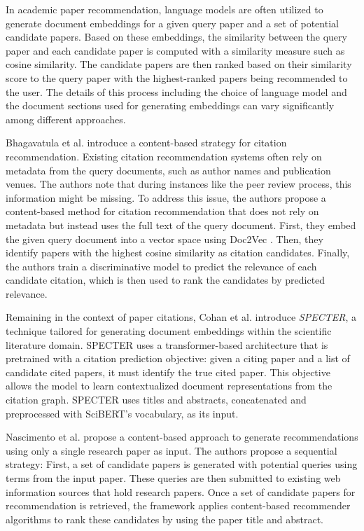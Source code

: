 In academic paper recommendation, language models are often utilized to generate document embeddings for a given query paper and a set of potential candidate papers.
Based on these embeddings, the similarity between the query paper and each candidate paper is computed with a similarity measure such as cosine similarity. The candidate papers are then ranked based on their similarity score to the query paper with the highest-ranked papers being recommended to the user.
The details of this process including the choice of language model and the document sections used for generating embeddings can vary significantly among different approaches.

Bhagavatula et al. \cite{BhagavatulaContentBasedCitation2018} introduce a content-based strategy for citation recommendation. Existing citation recommendation systems often rely on metadata from the query documents, such as author names and publication venues. The authors note that during instances like the peer review process, this information might be missing. To address this issue, the authors propose a content-based method for citation recommendation that does not rely on metadata but instead uses the full text of the query document.
First, they embed the given query document into a vector space using Doc2Vec \cite{LeDistributedRepresentations2014}. Then, they identify papers with the highest cosine similarity as citation candidates. Finally, the authors train a discriminative model to predict the relevance of each candidate citation, which is then used to rank the candidates by predicted relevance.

Remaining in the context of paper citations, Cohan et al. \cite{CohanSPECTERDocumentlevel2020} introduce \emph{SPECTER}, a technique tailored for generating document embeddings within the scientific literature domain. SPECTER uses a transformer-based architecture that is pretrained with a citation prediction objective: given a citing paper and a list of candidate cited papers, it must identify the true cited paper. This objective allows the model to learn contextualized document representations from the citation graph.
SPECTER uses titles and abstracts, concatenated and preprocessed with SciBERT’s \cite{BeltagySciBERTPretrained2019} vocabulary, as its input.

Nascimento et al. \cite{NascimentoSourceIndependent2011} propose a content-based approach to generate recommendations using only a single research paper as input.
The authors propose a sequential strategy:
First, a set of candidate papers is generated with potential queries using terms from the input paper.
These queries are then submitted to existing web information sources that hold research papers.
Once a set of candidate papers for recommendation is retrieved, the framework applies content-based recommender algorithms to rank these candidates by using the paper title and abstract.

